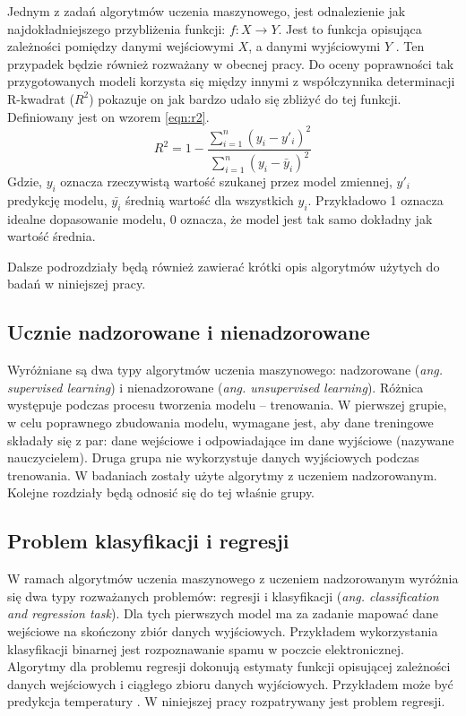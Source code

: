 Jednym z zadań algorytmów uczenia maszynowego, jest odnalezienie jak najdokładniejszego przybliżenia funkcji: $f \colon X \to Y$. 
 Jest to funkcja opisująca zależności pomiędzy danymi wejściowymi $X$, a danymi wyjściowymi $Y$ \cite{ml_supervised}. Ten przypadek będzie również rozważany w obecnej pracy. Do oceny poprawności tak przygotowanych modeli korzysta się między innymi z współczynnika determinacji R-kwadrat ($R^2$) pokazuje on jak bardzo udało się zbliżyć do tej funkcji. Definiowany jest on wzorem \ref{eqn:r2}. 
\begin{equation}
\label{eqn:r2}
R^2=1- \frac{ \sum_{i=1}^{n}(y_i-y'_i)^2}{\sum_{i=1}^{n}(y_i-\bar{y}_i)^2 }
\end{equation}
Gdzie, $y_i$ oznacza rzeczywistą wartość szukanej przez model zmiennej, $y'_i$ predykcję modelu, $\bar{y_i}$ średnią wartość dla wszystkich $y_i$. Przykładowo 1 oznacza idealne dopasowanie modelu, 0 oznacza, że model jest tak samo dokładny jak wartość średnia.\par
Dalsze  podrozdziały będą również zawierać krótki opis algorytmów użytych do badań w niniejszej pracy.

\subsection{Ucznie nadzorowane i nienadzorowane}
Wyróżniane są dwa typy algorytmów uczenia maszynowego: nadzorowane ({\em ang. supervised learning}) i nienadzorowane ({\em ang. unsupervised learning}). Różnica występuje podczas procesu tworzenia modelu -- trenowania. W pierwszej grupie, w celu poprawnego zbudowania modelu, wymagane jest, aby dane treningowe składały się z par: dane wejściowe i odpowiadające im  dane wyjściowe (nazywane nauczycielem). Druga grupa nie wykorzystuje danych wyjściowych podczas trenowania. W badaniach zostały użyte algorytmy z uczeniem nadzorowanym. Kolejne rozdziały będą odnosić się do tej właśnie grupy. \par 

\subsection{Problem klasyfikacji i regresji}
W ramach algorytmów uczenia maszynowego z uczeniem nadzorowanym wyróżnia się dwa typy rozważanych  problemów: regresji i klasyfikacji (\textit{ang. classification and regression task}). Dla tych pierwszych model ma za zadanie mapować dane wejściowe na skończony zbiór danych wyjściowych. Przykładem wykorzystania klasyfikacji binarnej jest rozpoznawanie spamu w poczcie elektronicznej. Algorytmy dla problemu regresji dokonują estymaty funkcji opisującej zależności danych wejściowych i ciągłego zbioru danych wyjściowych. Przykładem może być predykcja temperatury \cite{rf2}.
W niniejszej  pracy rozpatrywany  jest problem regresji. \par



